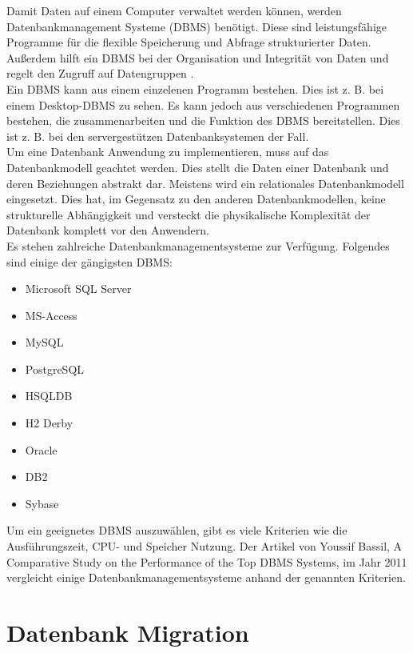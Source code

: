 	
Damit Daten auf einem Computer verwaltet werden können, werden Datenbankmanagement Systeme (DBMS) benötigt. Diese sind leistungsfähige Programme für die flexible Speicherung und Abfrage strukturierter Daten. \\
Außerdem hilft ein DBMS bei der Organisation und Integrität von Daten und regelt den Zugruff auf Datengruppen \cite{geisler2014datenbanken}. \\
Ein DBMS kann aus einem einzelenen Programm bestehen. Dies ist z. B. bei einem Desktop-DBMS zu sehen. Es kann jedoch aus verschiedenen Programmen bestehen, die zusammenarbeiten und die Funktion des DBMS bereitstellen. Dies ist z. B. bei den servergestützen Datenbanksystemen der Fall.\\
Um eine Datenbank Anwendung zu implementieren, muss auf das Datenbankmodell geachtet werden. Dies stellt die Daten einer Datenbank und deren Beziehungen abstrakt dar. Meistens wird ein relationales Datenbankmodell eingesetzt. Dies hat, im Gegensatz zu den anderen Datenbankmodellen, keine strukturelle Abhängigkeit und versteckt die physikalische Komplexität der Datenbank komplett vor den Anwendern.\\
Es stehen zahlreiche Datenbankmanagementsysteme zur Verfügung. Folgendes sind einige der gängigsten DBMS:
\begin{itemize}
	\item Microsoft SQL Server
	\item MS-Access
	\item MySQL
	\item PostgreSQL
	\item HSQLDB
	\item H2 Derby
	\item Oracle
	\item DB2
	\item Sybase
\end{itemize}
Um ein geeignetes DBMS auszuwählen, gibt es viele Kriterien wie die Ausführungszeit, CPU- und Speicher Nutzung. Der Artikel von Youssif Bassil, A Comparative Study on the Performance of the Top DBMS Systems, im Jahr 2011 vergleicht einige Datenbankmanagementsysteme anhand der genannten Kriterien.
\section{Datenbank Migration}

